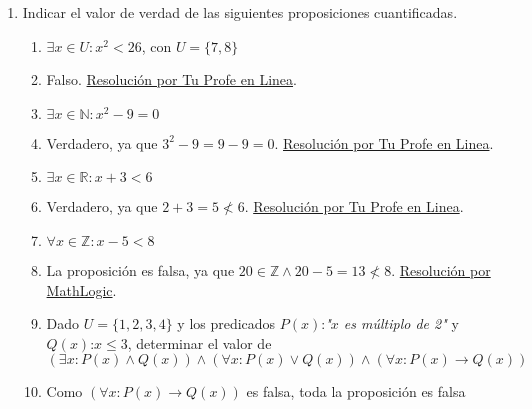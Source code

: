 \documentclass[a4paper]{article}
\newcommand{\answer}{\item[**]}
\newcommand{\exercise}{\item}
\newcommand{\then}{\to}
\begin{document}
\begin{enumerate}[resume]
\begin{enumerate} [label=(\alph*)]
		\item Ana no duerme. Todos los que tienen sueño, duermen. Hay una persona joven que no tiene sueño. Todos los 	arquitectos que no tienen sueño escuchan la radio. En todos los casos los jóvenes tienen sueño o usan la computadora. Marcos es un arquitecto que usa la computadora. No hay nadie que escuche la radio y use la computadora. Hay alguien que no es arquitecto, escucha la radio y tiene sueño.
		\answer Dado el universo $U = \{x ~|~ x$ es una persona$\}$, y los predicados $D(x)$:\textit{"$x$ duerme"}, $S(x)$:\textit{"$x$ tiene sueño"}, $J(x)$:\textit{"$x$ es joven"}, $A(x)$:\textit{"$x$ es arquitecto"}, $R(x)$:\textit{"$x$ escucha la radio"} y $C(x)$:\textit{"$x$ usa la computadora"}. Se simboliza $\neg D(Ana)$, $\forall x:S(x) \then  D(x)$, $\exists x: J(x) \land  S(x)$, $\forall x: A(x) \land  \neg S(x) \then  R(x)$, $\forall x: J(x) \then  S(x) \lor  C(x) $, $A(Marcos) \land  C(Marcos)$, $\neg \left(\exists x: R(x) \land  C(x) \right)$ y finalmente $\exists x: \neg A(x) \land  R(x) \land  S(x) $.

	\end{enumerate}


	\exercise Indicar el valor de verdad de las siguientes proposiciones cuantificadas. 
	\begin{enumerate} [label=(\alph*)]

		\item $\exists x \in U: x^2 < 26$, con $U=\{7,8\}$
		\answer Falso. \href{https://youtu.be/ChfOh0xG7Ok?t=305}{Resolución por Tu Profe en Linea}.

		\item $\exists x \in \mathbb{N}: x^2 -9 =0$
		\answer Verdadero, ya que $3^2-9=9-9=0$. \href{https://youtu.be/ChfOh0xG7Ok?t=460}{Resolución por Tu Profe en Linea}.

		\item $\exists x \in \mathbb{R}: x+3 < 6$
		\answer Verdadero, ya que $2 + 3 = 5 \nless 6$. \href{https://youtu.be/ChfOh0xG7Ok?t=557}{Resolución por Tu Profe en Linea}.

		\item $\forall x \in \mathbb{Z}: x-5 < 8$ 
		\answer La proposición es falsa, ya que $20 \in \mathbb{Z} \land 20-5 = 13 \nless 8$. \href{https://youtu.be/rnaCiSpVtP4?t=303}{Resolución por MathLogic}.

		\item Dado $U = \{1,2,3,4\}$ y los predicados $P(x)$:\textit{"$x$ es múltiplo de 2"} y $Q(x)$:\textit{$x \leq 3$}, determinar el valor de $\left(\exists x: P(x) \land  Q(x) \right) \land \left(\forall x: P(x) \lor  Q(x) \right) \land  \left(\forall x: P(x) \then  Q(x) \right)$
		\answer Como $\left(\forall x: P(x) \then  Q(x) \right)$ es falsa, toda la proposición es falsa


\end{enumerate}
\end{enumerate}
\end{document}
